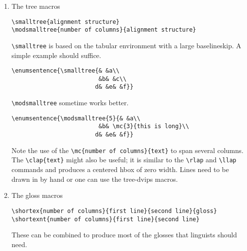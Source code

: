 \begin{enumerate}
\item The tree macros
\begin{center}
\begin{verbatim}
\smalltree{alignment structure}
\modsmalltree{number of columns}{alignment structure}
\end{verbatim}
\end{center}
\verb+\smalltree+ is based on the tabular environment with a large
baselineskip. A simple example should suffice.
\begin{center}
\begin{verbatim}
\enumsentence{\smalltree{& &a\\ 
                         &b& &c\\ 
                        d& &e& &f}}
\end{verbatim}
\end{center}
\verb+\modsmalltree+ sometime works better.
\begin{center}
\begin{verbatim}
\enumsentence{\modsmalltree{5}{& &a\\ 
                         &b& \mc{3}{this is long}\\ 
                        d& &e& &f}}
\end{verbatim}
\end{center}
 Note the use of the \verb+\mc{number of columns}{text}+ to span
several columns.  The \verb+\clap{text}+ might also be useful; it is
similar to the \verb+\rlap+ and \verb+\llap+ commands and produces a
centered hbox of zero width.  Lines need to be drawn in by hand or one
can use the tree-dvips macros. 

\item The gloss macros
\begin{center}
\begin{verbatim}
\shortex{number of columns}{first line}{second line}{gloss}
\shortexnt{number of columns}{first line}{second line}
\end{verbatim}
\end{center}
These can be combined to produce most of the glosses that linguists
should need.
\end{enumerate}

